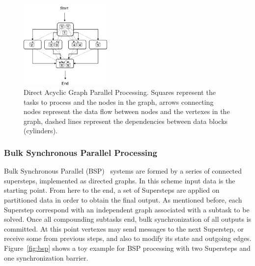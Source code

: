 \documentclass[3p,review]{elsarticle}
\begin{document}
	\begin{figure}[htp]
		\centering
		\includegraphics[width=0.4\textwidth]{dag}
		\caption{Direct Acyclic Graph Parallel Processing. Squares represent the tasks to process and the nodes in the graph, arrows connecting nodes represent the data flow between nodes and the vertexes in the graph, dashed lines represent the dependencies between data blocks (cylinders).}
		\label{fig:dag}
	\end{figure}
	
	
	\subsubsection{Bulk Synchronous Parallel Processing}
	
	Bulk Synchronous Parallel (BSP)~\cite{vali90} systems are formed by a series of connected supersteps, implemented as directed graphs. In this scheme input data is the starting point. From here to the end, a set of Supersteps are applied on partitioned data in order to obtain the final output. As mentioned before, each Superstep correspond with an independent graph associated with a subtask to be solved. Once all compounding subtasks end, bulk synchronization of all outputs is committed. At this point vertexes may send messages to the next Superstep, or receive some from previous steps, and also to modify its state and outgoing edges. Figure~\ref{fig:bsp} shows a toy example for BSP processing with two Supersteps and one synchronization barrier.
	
\end{document}
